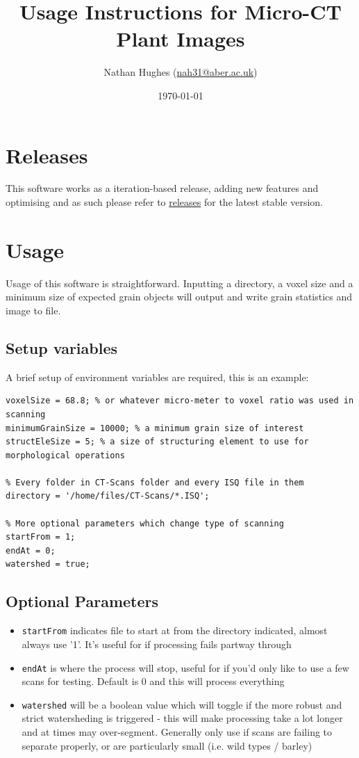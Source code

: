 \documentclass[a4paper]{article}
\author{Nathan Hughes (\href{mailto:nah31@aber.ac.uk}{nah31@aber.ac.uk})}
\date{\today}
\title{Usage Instructions for Micro-CT Plant Images}
\begin{document}
\maketitle
\clearpage

\section{Releases}
\label{sec:org275c173}
This software works as a iteration-based release, adding new features and optimising and as such please refer to \href{https://github.com/NPPC-UK/microCT\_grain\_analyser/releases}{releases} for the latest stable version.

\section{Usage}
\label{sec:org596304a}
Usage of this software is straightforward. Inputting a directory, a voxel size and a minimum size of expected grain objects will output and write grain statistics and image to file.

\subsection{Setup variables}
\label{sec:orgaa54d83}
A brief setup of environment variables are required, this is an example:

\begin{verbatim}
voxelSize = 68.8; % or whatever micro-meter to voxel ratio was used in scanning
minimumGrainSize = 10000; % a minimum grain size of interest
structEleSize = 5; % a size of structuring element to use for morphological operations

% Every folder in CT-Scans folder and every ISQ file in them
directory = '/home/files/CT-Scans/*.ISQ';

% More optional parameters which change type of scanning
startFrom = 1;
endAt = 0;
watershed = true;
\end{verbatim}

\subsection{Optional Parameters}
\label{sec:org717a8a0}

\begin{itemize}
\item \texttt{startFrom} indicates file to start at from the directory indicated, almost always use '1'. It's useful for if processing fails partway through
\item \texttt{endAt} is where the process will stop, useful for if you'd only like to use a few scans for testing. Default is 0 and this will process everything
\item \texttt{watershed} will be a boolean value which will toggle if the more robust and strict watersheding is triggered - this will make processing take a lot longer and at times may over-segment. Generally only use if scans are failing to separate properly, or are particularly small (i.e. wild types / barley)
\end{itemize}
\end{document}
